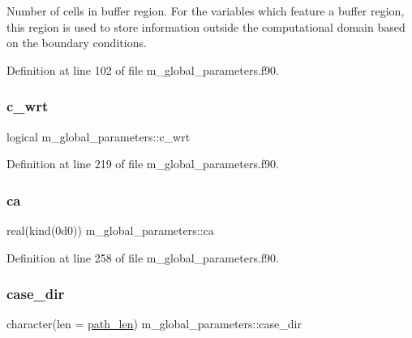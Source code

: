 Number of cells in buffer region. For the variables which feature a buffer region, this region is used to store information outside the computational domain based on the boundary conditions. 



Definition at line 102 of file m\+\_\+global\+\_\+parameters.\+f90.

\mbox{\label{namespacem__global__parameters_a56a071ae0b79b39a826646ace37972eb}} 
\subsubsection{\texorpdfstring{c\+\_\+wrt}{c\_wrt}}
{\footnotesize\ttfamily logical m\+\_\+global\+\_\+parameters\+::c\+\_\+wrt}



Definition at line 219 of file m\+\_\+global\+\_\+parameters.\+f90.

\mbox{\label{namespacem__global__parameters_a1fcd6cc13ad7f604ef81708716a1feac}} 
\subsubsection{\texorpdfstring{ca}{ca}}
{\footnotesize\ttfamily real(kind(0d0)) m\+\_\+global\+\_\+parameters\+::ca}



Definition at line 258 of file m\+\_\+global\+\_\+parameters.\+f90.

\mbox{\label{namespacem__global__parameters_a0b91e533fe3b3e112c42af4024014544}} 
\subsubsection{\texorpdfstring{case\+\_\+dir}{case\_dir}}
{\footnotesize\ttfamily character(len = \hyperlink{namespacem__global__parameters_aa9d578c318044b2f2ec990b5fc0dfab9}{path\+\_\+len}) m\+\_\+global\+\_\+parameters\+::case\+\_\+dir}



